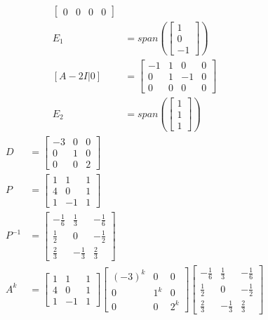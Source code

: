 \documentclass{math}
\begin{document}
\begin{align*}
\begin{bmatrix}
    0 & 0 & 0 & 0
  \end{bmatrix} \\
  E_1 &= span\left(\begin{bmatrix}1 \\ 0 \\ -1\end{bmatrix}\right) \\
  [A-2I|0] &= \begin{bmatrix}
    -1 & 1 & 0 & 0 \\
    0 & 1 & -1 & 0 \\
    0 & 0 & 0 & 0
  \end{bmatrix} \\
  E_2 &= span\left(\begin{bmatrix}1 \\ 1 \\ 1\end{bmatrix}\right)
\end{align*}
\begin{align*}
  D &= \begin{bmatrix}
    -3 & 0 & 0 \\
    0 & 1 & 0 \\
    0 & 0 & 2
  \end{bmatrix} \\
  P &= \begin{bmatrix}
    1 & 1 & 1 \\
    4 & 0 & 1 \\
    1 & -1 & 1
  \end{bmatrix} \\
  P^{-1} &= \begin{bmatrix}
    -\frac{1}{6} & \frac{1}{3} & -\frac{1}{6} \\
    \frac{1}{2} & 0 & -\frac{1}{2} \\
    \frac{2}{3} & -\frac{1}{3} & \frac{2}{3}
  \end{bmatrix} \\
  A^k &= \begin{bmatrix}
    1 & 1 & 1 \\
    4 & 0 & 1 \\
    1 & -1 & 1
  \end{bmatrix}\begin{bmatrix}
    (-3)^k & 0 & 0 \\
    0 & 1^k & 0 \\
    0 & 0 & 2^k
  \end{bmatrix}\begin{bmatrix}
    -\frac{1}{6} & \frac{1}{3} & -\frac{1}{6} \\
    \frac{1}{2} & 0 & -\frac{1}{2} \\
    \frac{2}{3} & -\frac{1}{3} & \frac{2}{3}
  \end{bmatrix}
\end{align*}
\end{document}
